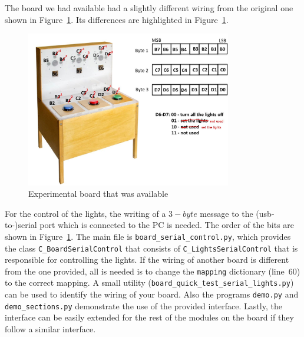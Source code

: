 The board we had available had a slightly different wiring from the original one shown in Figure~\ref{fig:experimental_board2}. Its differences are highlighted in Figure~\ref{fig:experimental_board2}.
\begin{figure}[htb]
\begin{center}
\includegraphics[width=0.8\textwidth]{lights2.jpg}
\end{center}
\caption{Experimental board that was available}
\label{fig:experimental_board2}
\end{figure}

For the control of the lights, the writing of a $3-byte$ message to the (usb-to-)serial port which is connected to the PC is needed. The order of the bits are shown in Figure~\ref{fig:experimental_board2}. The main file is \texttt{board\_serial\_control.py}, which provides the class \texttt{C\_BoardSerialControl} that consists of \texttt{C\_LightsSerialControl} that is responsible for controlling the lights. If the wiring of another board is different from the one provided, all is needed is to change the \texttt{mapping} dictionary (line~60) to the correct mapping. A small utility (\texttt{board\_quick\_test\_serial\_lights.py}) can be used to identify the wiring of your board. Also the programs \texttt{demo.py} and \texttt{demo\_sections.py} demonstrate the use of the provided interface. Lastly, the interface can be easily extended for the rest of the modules on the board if they follow a similar interface.
